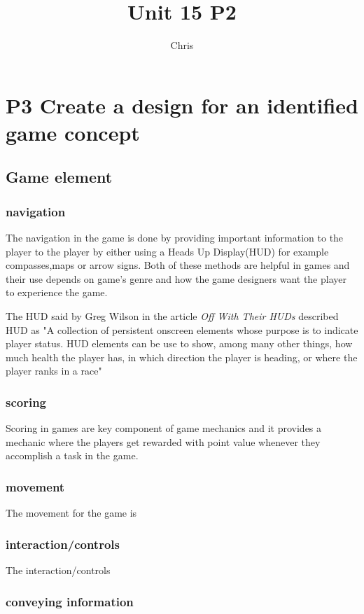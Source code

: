 \documentclass{article}
\title{Unit 15 P2}
\author{Chris}
\date{}
\begin{document}
\maketitle
\tableofcontents
\break

\section{P3 Create a design for an identified game concept}

\subsection{Game element}
\subsubsection{navigation}
The navigation in the game is done by providing important information to the player to the player by either using a Heads Up Display(HUD) for example compasses,maps or arrow signs. Both of these methods are helpful in games and their use depends on game's genre and how the game designers want the player to experience the game.

The HUD said by Greg Wilson in the article \textit{Off With Their HUDs} described HUD as "A collection of persistent onscreen elements whose purpose is to indicate player status. HUD elements can be use to show, among many other things, how much health the player has, in which direction the player is heading, or where the player ranks in a race" 



\subsubsection{scoring}
Scoring in games are key component of game mechanics and it provides a mechanic where the players get rewarded with point value whenever they accomplish a task in the game.  

\subsubsection{movement}
The movement for the game is

\subsubsection{interaction/controls}
The interaction/controls 


\subsubsection{conveying information}
\end{document}
